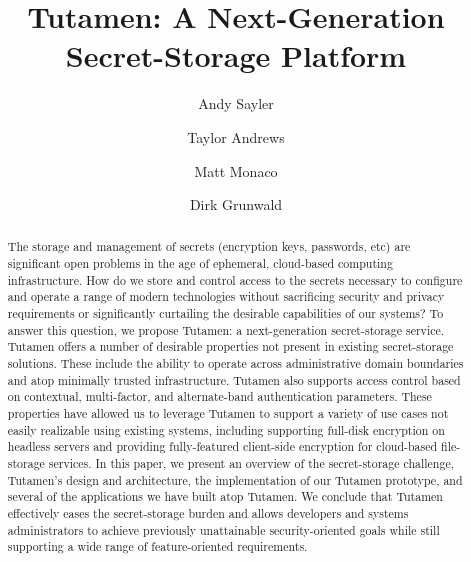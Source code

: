 \documentclass[10pt,twocolumn]{article}
\begin{document}
\title{Tutamen: A Next-Generation Secret-Storage Platform}

\author{Andy Sayler}
\author{Taylor Andrews}
\author{Matt Monaco}
\author{Dirk Grunwald}

\date{}

\maketitle

\begin{abstract}
The storage and management of secrets (encryption keys, passwords,
etc) are significant open problems in the age of ephemeral,
cloud-based computing infrastructure. How do we store and control
access to the secrets necessary to configure and operate a range of
modern technologies without sacrificing security and privacy
requirements or significantly curtailing the desirable capabilities of
our systems? To answer this question, we propose Tutamen: a
next-generation secret-storage service. Tutamen offers a number of
desirable properties not present in existing secret-storage
solutions. These include the ability to operate across administrative
domain boundaries and atop minimally trusted infrastructure. Tutamen
also supports access control based on contextual, multi-factor, and
alternate-band authentication parameters. These properties have
allowed us to leverage Tutamen to support a variety of use cases not
easily realizable using existing systems, including supporting
full-disk encryption on headless servers and providing fully-featured
client-side encryption for cloud-based file-storage services. In this
paper, we present an overview of the secret-storage challenge,
Tutamen's design and architecture, the implementation of our Tutamen
prototype, and several of the applications we have built atop
Tutamen. We conclude that Tutamen effectively eases the secret-storage
burden and allows developers and systems administrators to achieve
previously unattainable security-oriented goals while still supporting
a wide range of feature-oriented requirements.
\end{abstract}








{
  
  
}
\end{document}
